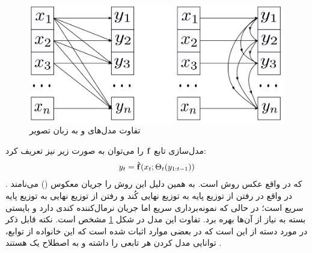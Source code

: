 \begin{figure}[h]
	\centering
	\includegraphics[width=.5\textwidth]{images/flow-survey2.png}
	\caption{
        تفاوت مدل‌های  و  به زبان تصویر \cite{iaf, maf, flow_survey}
	}
\label{fig:chap2:mafvsiaf}
\end{figure}

مدل‌سازی تابع \autoregressive{}
${\bf f}$
را می‌توان به صورت زیر نیز تعریف کرد:
\begin{align}
	y_t = \hat{{\bf f}}(x_t; \Theta_t(y_{1:t-1}))
\end{align}
که در واقع عکس روش  است. به همین دلیل این روش را جریان \autoregressive{} معکوس ()
 می‌نامند \cite{iaf, flow_survey}. در واقع در  رفتن از توزیع پایه به توزیع نهایی کُند و رفتن از توزیع نهایی به توزیع پایه سریع است؛ در حالی که  نمونه‌برداری سریع اما جریان نرمال‌کننده کندی دارد و بایستی بسته به نیاز از آن‌ها بهره برد. تفاوت این مدل در شکل \ref{fig:chap2:mafvsiaf} مشخص است.
نکته قابل ذکر در مورد دسته \autoregressive{}  از \normalizingflownets{} این است که در  بعضی موارد اثبات شده است که این خانواده از توابع، توانایی مدل کردن هر تابعی را داشته و به اصطلاح یک
هستند \cite{flow_survey}.
